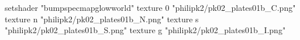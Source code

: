 setshader "bumpspecmapglowworld"
    texture 0 "philipk2/pk02_plates01b_C.png"
    texture n "philipk2/pk02_plates01b_N.png"
    texture s "philipk2/pk02_plates01b_S.png"
    texture g "philipk2/pk02_plates01b_I.png"